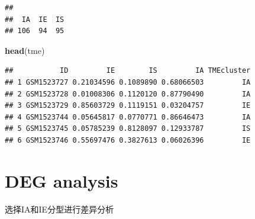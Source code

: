 \documentclass[
  12pt,
]{book}
\newenvironment{Shaded}{\begin{snugshade}}{\end{snugshade}}
\newcommand{\AttributeTok}[1]{\textcolor[rgb]{0.13,0.29,0.53}{#1}}
\newcommand{\ConstantTok}[1]{\textcolor[rgb]{0.56,0.35,0.01}{#1}}
\newcommand{\FloatTok}[1]{\textcolor[rgb]{0.00,0.00,0.81}{#1}}
\newcommand{\FunctionTok}[1]{\textcolor[rgb]{0.13,0.29,0.53}{\textbf{#1}}}
\newcommand{\NormalTok}[1]{#1}
\newcommand{\OtherTok}[1]{\textcolor[rgb]{0.56,0.35,0.01}{#1}}
\newcommand{\SpecialCharTok}[1]{\textcolor[rgb]{0.81,0.36,0.00}{\textbf{#1}}}
\newcommand{\StringTok}[1]{\textcolor[rgb]{0.31,0.60,0.02}{#1}}
\theoremstyle{definition}
\theoremstyle{definition}
\theoremstyle{definition}
\theoremstyle{definition}
\theoremstyle{remark}
\begin{document}
\begin{verbatim}
## 
##  IA  IE  IS 
## 106  94  95
\end{verbatim}

\begin{Shaded}
\begin{Highlighting}[]
\FunctionTok{head}\NormalTok{(tme)}
\end{Highlighting}
\end{Shaded}

\begin{verbatim}
##           ID         IE        IS         IA TMEcluster
## 1 GSM1523727 0.21034596 0.1089890 0.68066503         IA
## 2 GSM1523728 0.01008306 0.1120120 0.87790490         IA
## 3 GSM1523729 0.85603729 0.1119151 0.03204757         IE
## 4 GSM1523744 0.05645817 0.0770771 0.86646473         IA
## 5 GSM1523745 0.05785239 0.8128097 0.12933787         IS
## 6 GSM1523746 0.55697476 0.3827613 0.06026396         IE
\end{verbatim}

\hypertarget{deg-analysis}{%
\section{DEG analysis}\label{deg-analysis}}

选择IA和IE分型进行差异分析

\begin{Shaded}
\end{Shaded}
\end{document}
